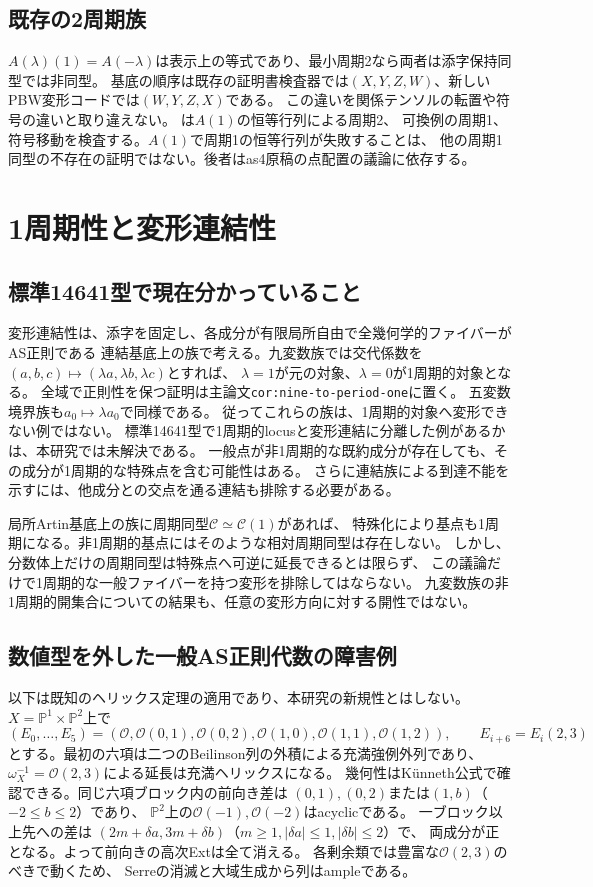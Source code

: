 \documentclass[11pt,a4paper]{ltjsarticle}
\begin{document}
\subsection*{既存の2周期族}
$A(\lambda)(1)=A(-\lambda)$は表示上の等式であり、最小周期2なら両者は添字保持同型では非同型。
基底の順序は既存の証明書検査器では$(X,Y,Z,W)$、新しいPBW変形コードでは$(W,Y,Z,X)$である。
この違いを関係テンソルの転置や符号の違いと取り違えない。
は$A(1)$の恒等行列による周期2、
可換例の周期1、符号移動を検査する。$A(1)$で周期1の恒等行列が失敗することは、
他の周期1同型の不存在の証明ではない。後者はas4原稿の点配置の議論に依存する。

\section{1周期性と変形連結性}
\subsection*{標準14641型で現在分かっていること}
変形連結性は、添字を固定し、各成分が有限局所自由で全幾何学的ファイバーがAS正則である
連結基底上の族で考える。九変数族では交代係数を
$(a,b,c)\mapsto(\lambda a,\lambda b,\lambda c)$とすれば、
$\lambda=1$が元の対象、$\lambda=0$が1周期的対象となる。
全域で正則性を保つ証明は主論文\texttt{cor:nine-to-period-one}に置く。
五変数境界族も$a_0\mapsto\lambda a_0$で同様である。
従ってこれらの族は、1周期的対象へ変形できない例ではない。
標準14641型で1周期的locusと変形連結に分離した例があるかは、本研究では未解決である。
一般点が非1周期的な既約成分が存在しても、その成分が1周期的な特殊点を含む可能性はある。
さらに連結族による到達不能を示すには、他成分との交点を通る連結も排除する必要がある。

局所Artin基底上の族に周期同型$\mathcal C\simeq\mathcal C(1)$があれば、
特殊化により基点も1周期になる。非1周期的基点にはそのような相対周期同型は存在しない。
しかし、分数体上だけの周期同型は特殊点へ可逆に延長できるとは限らず、
この議論だけで1周期的な一般ファイバーを持つ変形を排除してはならない。
九変数族の非1周期的開集合についての結果も、任意の変形方向に対する開性ではない。

\subsection*{数値型を外した一般AS正則代数の障害例}
以下は既知のヘリックス定理の適用であり、本研究の新規性とはしない。
$X=\mathbb P^1\times\mathbb P^2$上で
\[
 (E_0,\ldots,E_5)=
 (\mathcal O,\mathcal O(0,1),\mathcal O(0,2),
 \mathcal O(1,0),\mathcal O(1,1),\mathcal O(1,2)),\qquad
 E_{i+6}=E_i(2,3)
\]
とする。最初の六項は二つのBeilinson列の外積による充満強例外列であり、
$\omega_X^{-1}=\mathcal O(2,3)$による延長は充満ヘリックスになる。
幾何性はK\"unneth公式で確認できる。同じ六項ブロック内の前向き差は
$(0,1),(0,2)$または$(1,b)$（$-2\le b\le2$）であり、
$\mathbb P^2$上の$\mathcal O(-1),\mathcal O(-2)$はacyclicである。
一ブロック以上先への差は
$(2m+\delta a,3m+\delta b)$（$m\ge1,|\delta a|\le1,|\delta b|\le2$）で、
両成分が正となる。よって前向きの高次Extは全て消える。
各剰余類では豊富な$\mathcal O(2,3)$のべきで動くため、
Serreの消滅と大域生成から列はampleである。
\end{document}

